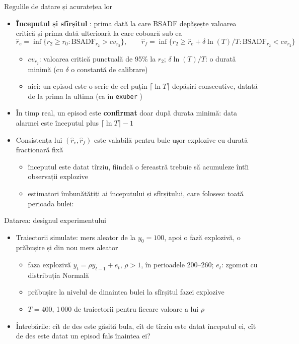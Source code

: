 \begin{frame}{Regulile de datare și acuratețea lor}
\itemsize{\small}
\begin{itemize}
    \item \textbf{Începutul și sfîrșitul} : prima dată la care BSADF depășește valoarea critică și prima dată ulterioară la care coboară sub ea \[ \hat r_e = \inf\{r_2 \ge r_0: \mathrm{BSADF}_{r_2} > cv_{r_2}\}, \qquad \hat r_f = \inf\{r_2 \ge \hat r_e + \delta\ln(T)/T: \mathrm{BSADF}_{r_2} < cv_{r_2}\} \]
    \begin{itemize}
        \item $cv_{r_2}$: valoarea critică punctuală de 95\% la $r_2$; $\delta\ln(T)/T$: o durată minimă (cu $\delta$ o constantă de calibrare)
        \item aici: un episod este o serie de cel puțin $\lceil\ln T\rceil$ depășiri consecutive, datată de la prima la ultima (ca în \texttt{exuber} )
    \end{itemize}
    \item În timp real, un episod este \textbf{confirmat} doar după durata minimă: data alarmei este începutul plus $\lceil\ln T\rceil - 1$
    \item Consistența lui $(\hat r_e, \hat r_f)$ este valabilă pentru bule ușor explozive cu durată fracționară fixă 
    \begin{itemize}
        \item începutul este datat tîrziu, fiindcă o fereastră trebuie să acumuleze întîi observații explozive
        \item estimatori îmbunătățiți ai începutului și sfîrșitului, care folosesc toată perioada bulei: 
    \end{itemize}
\end{itemize}
\end{frame}

\begin{frame}{Datarea: designul experimentului}
\itemsize{\small}
\begin{itemize}
    \item Traiectorii simulate: mers aleator de la $y_0 = 100$, apoi o fază explozivă, o prăbușire și din nou mers aleator
    \begin{itemize}
        \item faza explozivă $y_t = \rho y_{t-1} + e_t$, $\rho > 1$, în perioadele 200--260; $e_t$: zgomot cu distribuția Normală
        \item prăbușire la nivelul de dinaintea bulei la sfîrșitul fazei explozive
        \item $T = 400$, 1\,000 de traiectorii pentru fiecare valoare a lui $\rho$
    \end{itemize}
    \item Întrebările: cît de des este găsită bula, cît de tîrziu este datat începutul ei, cît de des este datat un episod fals înaintea ei?
\end{itemize}
\end{frame}

